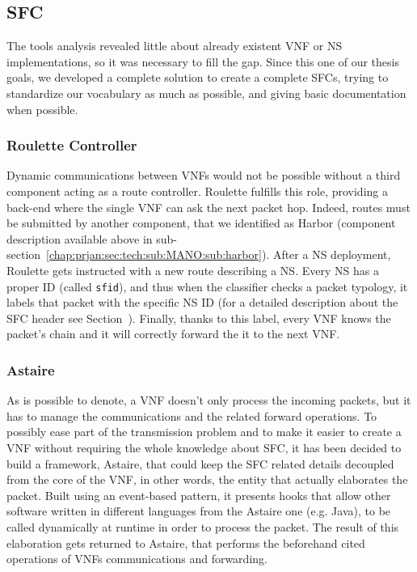 \subsection{SFC}
The tools analysis revealed little about already existent VNF or NS
implementations, so it was necessary to fill the gap. Since this one of our
thesis goals, we developed a complete solution to create a complete SFCs, trying
to standardize our vocabulary as much as possible, and giving basic
documentation when possible.

\subsubsection{Roulette Controller}
\label{chap:prjan:sec:tech:sub:SFC:sub:roulette}
Dynamic communications between VNFs would not be possible without a third
component acting as a route controller. Roulette fulfills this role, providing a
back-end where the single VNF can ask the next packet hop. Indeed, routes must 
be
submitted by another component, that we identified as Harbor (component
description available above in
sub-section~\ref{chap:prjan:sec:tech:sub:MANO:sub:harbor}). After a NS
deployment, Roulette gets instructed with a new route describing a NS. Every NS
has a proper ID (called \verb!sfid!), and thus when the classifier checks a
packet typology, it labels that packet with the specific NS ID (for a detailed
description about the SFC header see Section~). Finally, thanks to this label, every VNF knows the packet's chain and
it will correctly forward the it to the next VNF.

\subsubsection{Astaire}
As is possible to denote, a VNF doesn't only process the incoming packets, 
but it has to manage the communications and the related forward operations. To 
possibly ease part of the transmission problem and to make it easier to create 
a 
VNF without requiring the whole knowledge about SFC, it has been decided to 
build a framework, Astaire, that could keep the SFC related details decoupled 
from the core of the VNF, in other words, the entity that actually elaborates 
the packet. Built using an event-based pattern, it presents hooks that allow 
other software written in different languages from the Astaire one (e.g. Java), 
to be called dynamically at runtime in order to process the packet. The result 
of this elaboration gets returned to Astaire, that performs the beforehand 
cited operations of VNFs communications and forwarding.


